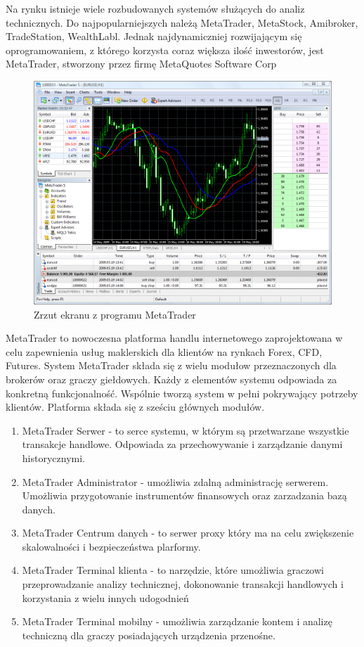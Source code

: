\documentclass[pdflatex,11pt]{aghdpl}
\begin{document}
Na rynku istnieje wiele rozbudowanych systemów służących do analiz technicznych. Do najpopularniejszych należą MetaTrader, MetaStock, Amibroker, TradeStation, WealthLabl. Jednak najdynamiczniej rozwijającym się oprogramowaniem, z którego korzysta coraz większa ilość inwestorów, jest MetaTrader, stworzony przez firmę MetaQuotes Software Corp
\begin{figure}[ht]
\begin{center}
\includegraphics[width=15cm]{metatrader.png}
\caption{Zrzut ekranu z programu MetaTrader}
\label{swieca2}
\end{center}
\end{figure} 
MetaTrader to nowoczesna platforma handlu internetowego zaprojektowana w celu zapewnienia usług maklerskich dla klientów na rynkach Forex, CFD, Futures. System MetaTrader składa się z wielu modułow przeznaczonych dla brokerów oraz graczy giełdowych. Każdy z elementów systemu odpowiada za konkretną funkcjonalność. Wspólnie tworzą system w pełni pokrywający potrzeby klientów. Platforma składa się z sześciu głównych modułów.
 \begin{enumerate}
\item MetaTrader Serwer - to serce systemu, w którym są przetwarzane wszystkie transakcje handlowe. Odpowiada za przechowywanie i zarządzanie danymi historycznymi.
\item MetaTrader Administrator - umożliwia zdalną administrację serwerem. Umożliwia przygotowanie instrumentów finansowych oraz zarzadzania bazą danych.
\item MetaTrader Centrum danych - to serwer proxy który ma na celu zwiększenie skalowalności i bezpieczeństwa plarformy.
\item MetaTrader Terminal klienta - to narzędzie, które umożliwia graczowi przeprowadzanie analizy technicznej, dokonowanie transakcji handlowych i korzystania z wielu innych udogodnień
\item MetaTrader Terminal mobilny - umożliwia zarządzanie kontem i analizę techniczną dla graczy posiadających urządzenia przenośne.
\end{enumerate}
\end{document}
